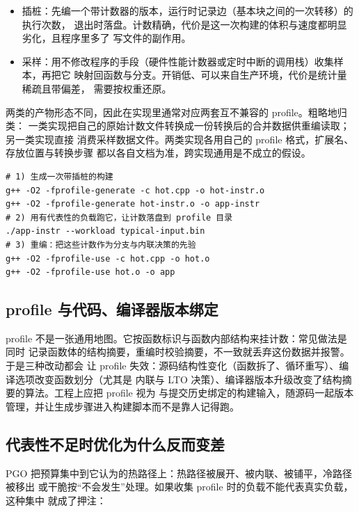 \documentclass[12pt,a4paper,fontset=fandol]{ctexbook}
\newcommand{\Mx}[1]{\textsf{#1}}
\begin{document}
\begin{itemize}
  \item 插桩：先编一个带计数器的版本，运行时记录边（基本块之间的一次转移）的执行次数，
        退出时落盘。计数精确，代价是这一次构建的体积与速度都明显劣化，且程序里多了
        写文件的副作用。
  \item 采样：用不修改程序的手段（硬件性能计数器或定时中断的调用栈）收集样本，再把它
        映射回函数与分支。开销低、可以来自生产环境，代价是统计量稀疏且带偏差，
        需要按权重还原。
\end{itemize}

两类的产物形态不同，因此在实现里通常对应两套互不兼容的 profile。粗略地归类：
一类实现把自己的原始计数文件转换成一份转换后的合并数据供重编读取；另一类实现直接
消费采样数据文件。两类实现各用自己的 \Mx{profile} 格式，扩展名、存放位置与转换步骤
都以各自文档为准，跨实现通用是不成立的假设。

\begin{lstlisting}[style=shellstyle, caption={PGO 的三步形态：生成、运行、消费（示意）}]
# 1) 生成一次带插桩的构建
g++ -O2 -fprofile-generate -c hot.cpp -o hot-instr.o
g++ -O2 -fprofile-generate hot-instr.o -o app-instr
# 2) 用有代表性的负载跑它，让计数落盘到 profile 目录
./app-instr --workload typical-input.bin
# 3) 重编：把这些计数作为分支与内联决策的先验
g++ -O2 -fprofile-use -c hot.cpp -o hot.o
g++ -O2 -fprofile-use hot.o -o app
\end{lstlisting}

\subsection{profile 与代码、编译器版本绑定}\label{sec:cl05-profilebind}

\Mx{profile} 不是一张通用地图。它按函数标识与函数内部结构来挂计数：常见做法是同时
记录函数体的结构摘要，重编时校验摘要，不一致就丢弃这份数据并报警。于是三种改动都会
让 profile 失效：源码结构性变化（函数拆了、循环重写）、编译选项改变函数划分（尤其是
内联与 \Mx{LTO} 决策）、编译器版本升级改变了结构摘要的算法。工程上应把 profile 视为
与提交历史绑定的构建输入，随源码一起版本管理，并让生成步骤进入构建脚本而不是靠人记得跑。

\subsection{代表性不足时优化为什么反而变差}\label{sec:cl05-pgorisk}

\Mx{PGO} 把预算集中到它认为的热路径上：热路径被展开、被内联、被铺平，冷路径被移出
或干脆按“不会发生”处理。如果收集 \Mx{profile} 时的负载不能代表真实负载，这种集中
就成了押注：
\end{document}
